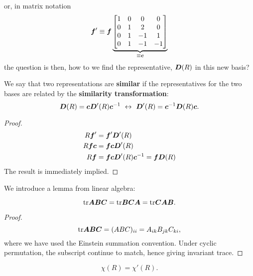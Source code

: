 or, in matrix notation
\begin{equation}
\boldsymbol{f}'\equiv\boldsymbol{f}
\underbrace{
\begin{bmatrix}
1 &0 &0 &0\\
0 &1 &2 &0\\
0 &1 &-1& 1\\
0 &1 &-1& -1
\end{bmatrix}}_{\equiv\boldsymbol{c}}
\end{equation}
the question is then, how to we find the representative, $\boldsymbol{D}(R)$ in this new basis?
\begin{thrm}
We say that two representations are \textbf{similar} if the representatives for 
the two bases are related by the \textbf{similarity transformation}:
\begin{equation}
\bvec{D}(R)=\bvec{c}\bvec{D}'(R)\bvec{c}^{-1}\ \leftrightarrow\ \bvec{D}'(R)=\bvec{c}^{-1}\bvec{D}(R)\bvec{c}.
\end{equation}
\end{thrm}
\begin{proof}
\begin{equation}
\begin{aligned}
R\boldsymbol{f}'&=\boldsymbol{f}'\boldsymbol{D}'(R)\\
R\boldsymbol{fc}&=\boldsymbol{fcD}'(R)\\
R\boldsymbol{f}&=\boldsymbol{fcD}'(R)\boldsymbol{c}^{-1}=\boldsymbol{fD}(R)
\end{aligned}
\end{equation}
The result is immediately implied. 
\end{proof}
We introduce a lemma from linear algebra:
\begin{lemma}
\begin{equation}
\text{tr}\boldsymbol{ABC}=\text{tr}\boldsymbol{BCA}=\text{tr}\boldsymbol{CAB}.
\end{equation}
\end{lemma}
\begin{proof}
\begin{equation}
\text{tr}\boldsymbol{ABC}=(ABC)_{ii}=A_{ik}B_{jk}C_{ki},
\end{equation}
where we have used the Einstein summation convention. Under cyclic permutation, 
the subscript continue to match, hence giving invariant trace. 
\end{proof}
\begin{thrm}
\label{charinv}
\begin{equation}
\chi(R)=\chi'(R).
\end{equation}
\end{thrm}
